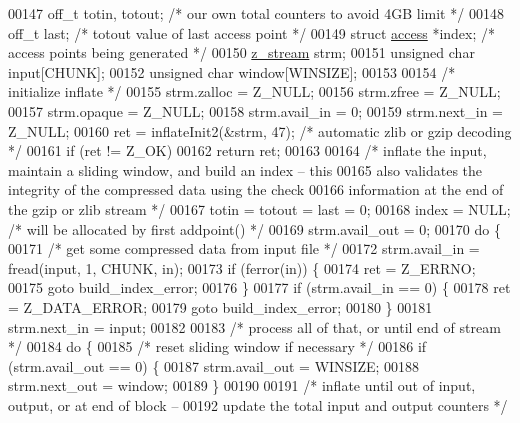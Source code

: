 \begin{DoxyCode}
00147     off\_t totin, totout;        \textcolor{comment}{/* our own total counters to avoid 4GB limit */}
00148     off\_t last;                 \textcolor{comment}{/* totout value of last access point */}
00149     \textcolor{keyword}{struct }\hyperlink{structaccess}{access} *index;       \textcolor{comment}{/* access points being generated */}
00150     \hyperlink{structz__stream__s}{z\_stream} strm;
00151     \textcolor{keywordtype}{unsigned} \textcolor{keywordtype}{char} input[CHUNK];
00152     \textcolor{keywordtype}{unsigned} \textcolor{keywordtype}{char} window[WINSIZE];
00153 
00154     \textcolor{comment}{/* initialize inflate */}
00155     strm.zalloc = Z\_NULL;
00156     strm.zfree = Z\_NULL;
00157     strm.opaque = Z\_NULL;
00158     strm.avail\_in = 0;
00159     strm.next\_in = Z\_NULL;
00160     ret = inflateInit2(&strm, 47);      \textcolor{comment}{/* automatic zlib or gzip decoding */}
00161     \textcolor{keywordflow}{if} (ret != Z\_OK)
00162         \textcolor{keywordflow}{return} ret;
00163 
00164     \textcolor{comment}{/* inflate the input, maintain a sliding window, and build an index -- this}
00165 \textcolor{comment}{       also validates the integrity of the compressed data using the check}
00166 \textcolor{comment}{       information at the end of the gzip or zlib stream */}
00167     totin = totout = last = 0;
00168     index = NULL;               \textcolor{comment}{/* will be allocated by first addpoint() */}
00169     strm.avail\_out = 0;
00170     \textcolor{keywordflow}{do} \{
00171         \textcolor{comment}{/* get some compressed data from input file */}
00172         strm.avail\_in = fread(input, 1, CHUNK, in);
00173         \textcolor{keywordflow}{if} (ferror(in)) \{
00174             ret = Z\_ERRNO;
00175             \textcolor{keywordflow}{goto} build\_index\_error;
00176         \}
00177         \textcolor{keywordflow}{if} (strm.avail\_in == 0) \{
00178             ret = Z\_DATA\_ERROR;
00179             \textcolor{keywordflow}{goto} build\_index\_error;
00180         \}
00181         strm.next\_in = input;
00182 
00183         \textcolor{comment}{/* process all of that, or until end of stream */}
00184         \textcolor{keywordflow}{do} \{
00185             \textcolor{comment}{/* reset sliding window if necessary */}
00186             \textcolor{keywordflow}{if} (strm.avail\_out == 0) \{
00187                 strm.avail\_out = WINSIZE;
00188                 strm.next\_out = window;
00189             \}
00190 
00191             \textcolor{comment}{/* inflate until out of input, output, or at end of block --}
00192 \textcolor{comment}{               update the total input and output counters */}

\end{DoxyCode}
